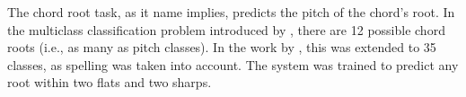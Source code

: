 
The chord root task, as it name implies, predicts the pitch
of the chord's root. In the multiclass classification
problem introduced by \textcite{chen2018functional}, there
are 12 possible chord roots (i.e., as many as pitch
classes). In the work by \textcite{micchi2020not}, this was
extended to 35 classes, as spelling was taken into account.
The system was trained to predict any root within two flats
and two sharps. 
